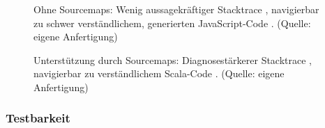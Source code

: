 \documentclass[a4paper, 12pt, hidelinks, listof=totoc, listoftables=totoc, bibliography=totoc]{scrreprt}
\begin{document}
\begin{figure}[!h]
	\centering
	\caption{Ohne Sourcemaps: Wenig aussagekräftiger Stacktrace \protect{}, navigierbar zu schwer verständlichem, generierten JavaScript-Code \protect{}. (Quelle: eigene Anfertigung)}
	\label{fig:no-sourcemaps}
\end{figure}

\begin{figure}[!h]
	\centering
	\caption{Unterstützung durch Sourcemaps: Diagnosestärkerer Stacktrace \protect{}, navigierbar zu verständlichem Scala-Code \protect{}. (Quelle: eigene Anfertigung)}
	\label{fig:sourcemaps}
\end{figure}


\subsubsection{Testbarkeit}
\end{document}
